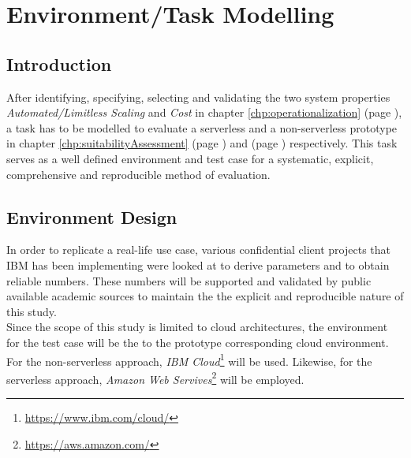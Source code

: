 \chapter{Environment/Task Modelling}\label{chp:environmentTaskModelling}


\section{Introduction}

After identifying, specifying, selecting and validating the two system properties \textit{Automated/Limitless Scaling} and \textit{Cost} in chapter \ref{chp:operationalization} (page \pageref{chp:operationalization}), a task has to be modelled to evaluate a serverless and a non-serverless prototype in chapter \ref{chp:suitabilityAssessment} (page \pageref{chp:suitabilityAssessment}) and \pageref{chp:viabilityAssessment}  (page \pageref{chp:viabilityAssessment}) respectively. This task serves as a well defined environment and test case for a systematic, explicit, comprehensive and reproducible method of evaluation. 

\section{Environment Design}

In order to replicate a real-life use case, various confidential client projects that IBM has been implementing were looked at to derive parameters and to obtain reliable numbers. These numbers will be supported and validated by public available academic sources to maintain the the explicit and reproducible nature of this study.\\
Since the scope of this study is limited to cloud architectures, the environment for the test case will be the to the prototype corresponding cloud environment. For the non-serverless approach, \textit{IBM Cloud}\footnote{\url{https://www.ibm.com/cloud/}} will be used. Likewise, for the serverless approach, \textit{Amazon Web Servives}\footnote{\url{https://aws.amazon.com/}} will be employed. 

